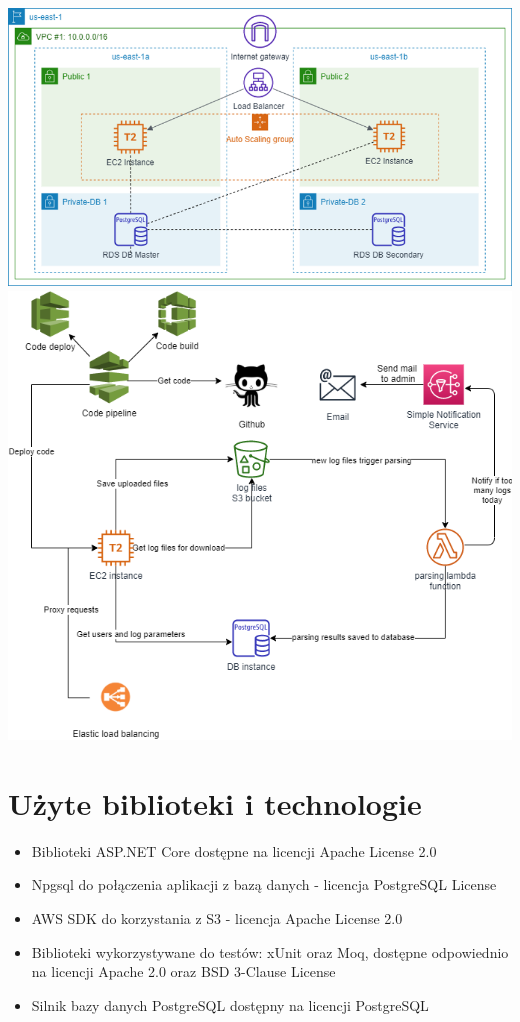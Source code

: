 \documentclass[12pt,a4paper]{article}
\begin{document}
        \begin{center}
            \includegraphics[scale=0.6]{d1.png}
            \includegraphics[scale=0.6]{d2.png}
        \end{center}
    \section{Użyte biblioteki i technologie}
        \begin{itemize}
            \item Biblioteki ASP.NET Core dostępne na licencji Apache License 2.0
            \item Npgsql do połączenia aplikacji z bazą danych - licencja PostgreSQL License
            \item AWS SDK do korzystania z S3 - licencja Apache License 2.0
            \item Biblioteki wykorzystywane do testów: xUnit oraz Moq, dostępne odpowiednio na licencji Apache 2.0 oraz BSD 3-Clause License
            \item Silnik bazy danych PostgreSQL dostępny na licencji PostgreSQL
        \end{itemize}
\end{document}

